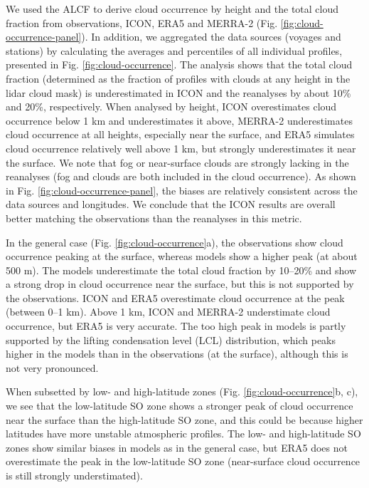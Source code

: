 \documentclass[12pt,a4paper]{article}
\begin{document}
We used the ALCF to derive cloud occurrence by height and the total cloud
fraction from observations, ICON, ERA5 and MERRA-2 (Fig.
\ref{fig:cloud-occurrence-panel}). In addition, we aggregated the data sources
(voyages and stations) by calculating the averages and percentiles of all
individual profiles, presented in Fig. \ref{fig:cloud-occurrence}. The analysis
shows that the total cloud fraction (determined as the fraction of profiles
with clouds at any height in the lidar cloud mask) is underestimated in ICON
and the reanalyses by about 10\% and 20\%, respectively. When analysed by
height, ICON overestimates cloud occurrence below 1 km and underestimates it
above, MERRA-2 underestimates cloud occurrence at all heights, especially near
the surface, and ERA5 simulates cloud occurrence relatively well above 1 km,
but strongly underestimates it near the surface.  We note that fog or
near-surface clouds are strongly lacking in the reanalyses (fog and clouds are
both included in the cloud occurrence).  As shown in Fig.
\ref{fig:cloud-occurrence-panel}, the biases are relatively consistent across
the data sources and longitudes. We conclude that the ICON results are overall
better matching the observations than the reanalyses in this metric.

In the general case (Fig. \ref{fig:cloud-occurrence}a), the observations show
cloud occurrence peaking at the surface, whereas models show a higher peak (at
about 500 m). The models underestimate the total cloud fraction by 10--20\% and
show a strong drop in cloud occurrence near the surface, but this is not
supported by the observations. ICON and ERA5 overestimate cloud occurrence at
the peak (between 0--1 km). Above 1 km, ICON and MERRA-2 understimate cloud
occurrence, but ERA5 is very accurate. The too high peak in models is partly
supported by the lifting condensation level (LCL) distribution, which peaks
higher in the models than in the observations (at the surface), although this
is not very pronounced.

When subsetted by low- and high-latitude zones (Fig.
\ref{fig:cloud-occurrence}b, c), we see that the low-latitude SO zone shows
a stronger peak of cloud occurrence near the surface than the high-latitude SO
zone, and this could be because higher latitudes have more unstable atmospheric
profiles. The low- and high-latitude SO zones show similar biases in models as
in the general case, but ERA5 does not overestimate the peak in the
low-latitude SO zone (near-surface cloud occurrence is still strongly
understimated).
\end{document}

